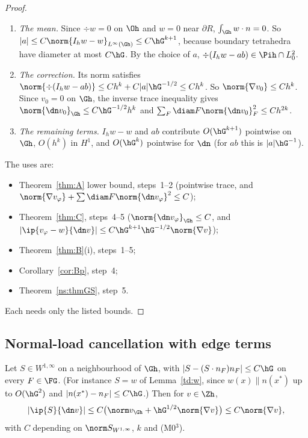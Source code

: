 \begin{proof}
\begin{enumerate}
\item \emph{The mean.} Since $\div w=0$ on $\Oh$ and $w=0$ near $\partial R$, $\int_{\Gh}w\cdot n=0$. So $|a|\le C\norm{I_hw-w}_{L^\infty(\Gh)}\le C\hG^{k+1}$, because boundary tetrahedra have diameter at most $C\hG$. By the choice of $a$, $\div(I_hw-ab)\in\Pih\cap L^2_0$.
\item \emph{The correction.} Its norm satisfies $\norm{\div(I_hw-ab)}\le Ch^k+C|a|\hG^{-1/2}\le Ch^k$. So $\norm{\nabla v_0}\le Ch^k$. Since $v_0=0$ on $\Gh$, the inverse trace inequality gives $\norm{\dn v_0}_{\Gh}\le C\hG^{-1/2}h^k$ and $\sum_F\diam F\norm{\dn v_0}^2_F\le Ch^{2k}$.
\item \emph{The remaining terms.} $I_hw-w$ and $ab$ contribute $O(\hG^{k+1})$ pointwise on $\Gh$, $O(h^k)$ in $H^1$, and $O(\hG^k)$ pointwise for $\dn$ (for $ab$ this is $|a|\hG^{-1}$).
\end{enumerate}
The uses are:
\begin{itemize}
\item Theorem~\ref{thm:A} lower bound, steps~1--2 (pointwise trace, and $\norm{\nabla v_\varphi}+\sum\diam F\norm{\dn v_\varphi}^2\le C$);
\item Theorem~\ref{thm:C}, steps~4--5 ($\norm{\dn v_\varphi}_{\Gh}\le C$, and $|\ip{v_\varphi-w}{\dn v}|\le C\hG^{k+1}\hG^{-1/2}\norm{\nabla v}$);
\item Theorem~\ref{thm:B}(i), steps~1--5;
\item Corollary~\ref{cor:Bp}, step~4;
\item Theorem~\ref{ns:thmGS}, step~5.
\end{itemize}
Each needs only the listed bounds.
\end{proof}

\subsection{Normal-load cancellation with edge terms}

\begin{lemma}\label{td:cancel}
Let $S\in W^{1,\infty}$ on a neighbourhood of $\Gh$, with $|S-(S\cdot n_F)n_F|\le C\hG$ on every $F\in\FG$. (For instance $S=w$ of Lemma~\ref{td:w}, since $w(x)\parallel n(x^\ast)$ up to $O(\hG^2)$ and $|n(x^\ast)-n_F|\le C\hG$.) Then for $v\in\Zh$,
\[
|\ip{S}{\dn v}|\le C\bigl(\norm v_{\Gh}+\hG^{1/2}\norm{\nabla v}\bigr)\le C\norm{\nabla v},
\]
with $C$ depending on $\norm S_{W^{1,\infty}}$, $k$ and (M0$^3$).
\end{lemma}


